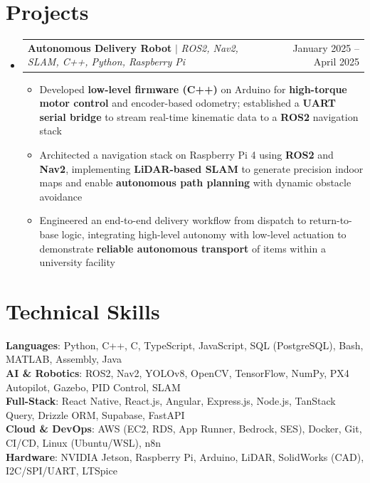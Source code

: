 \documentclass[letterpaper,11pt]{article}
\makeatletter
\newcommand{\resumeItem}[1]{
  \item\small{
    {#1 \vspace{-2pt}}
  }
}
\newcommand{\resumeProjectHeading}[2]{
    \item
    \begin{tabular*}{0.97\textwidth}{l@{\extracolsep{\fill}}r}
      \small#1 & #2 \\
    \end{tabular*}\vspace{-7pt}
}
\newcommand{\resumeSubHeadingListStart}{\begin{itemize}[leftmargin=0.15in, label={}]}
\newcommand{\resumeSubHeadingListEnd}{\end{itemize}}
\newcommand{\resumeItemListStart}{\begin{itemize}}
\newcommand{\resumeItemListEnd}{\end{itemize}\vspace{-5pt}}
\makeatother
\begin{document}
\section{Projects}
    \resumeSubHeadingListStart
      \resumeProjectHeading
          {\textbf{Autonomous Delivery Robot} $|$ \emph{ROS2, Nav2, SLAM, C++, Python, Raspberry Pi}}{January 2025 -- April 2025}
          \resumeItemListStart
             \resumeItem{Developed \textbf{low-level firmware (C++)} on Arduino for \textbf{high-torque motor control} and encoder-based odometry; established a \textbf{UART serial bridge} to stream real-time kinematic data to a \textbf{ROS2} navigation stack}
            \resumeItem{Architected a navigation stack on Raspberry Pi 4 using \textbf{ROS2} and \textbf{Nav2}, implementing \textbf{LiDAR-based SLAM} to generate precision indoor maps and enable \textbf{autonomous path planning} with dynamic obstacle avoidance}
            \resumeItem{Engineered an end-to-end delivery workflow from dispatch to return-to-base logic, integrating high-level autonomy with low-level actuation to demonstrate \textbf{reliable autonomous transport} of items within a university facility}
          \resumeItemListEnd
    \resumeSubHeadingListEnd



%
\section{Technical Skills}
 \begin{itemize}[leftmargin=0.15in, label={}]
    \small{\item{
\textbf{Languages}{: Python, C++, C, TypeScript, JavaScript, SQL (PostgreSQL), Bash, MATLAB, Assembly, Java} \\
\textbf{AI \& Robotics}{: ROS2, Nav2, YOLOv8, OpenCV, TensorFlow, NumPy, PX4 Autopilot, Gazebo, PID Control, SLAM} \\
\textbf{Full-Stack}{: React Native, React.js, Angular, Express.js, Node.js, TanStack Query, Drizzle ORM, Supabase, FastAPI} \\
\textbf{Cloud \& DevOps}{: AWS (EC2, RDS, App Runner, Bedrock, SES), Docker, Git, CI/CD, Linux (Ubuntu/WSL), n8n} \\
\textbf{Hardware}{: NVIDIA Jetson, Raspberry Pi, Arduino, LiDAR, SolidWorks (CAD), I2C/SPI/UART, LTSpice} \\
}}

 \end{itemize}


\end{document}
